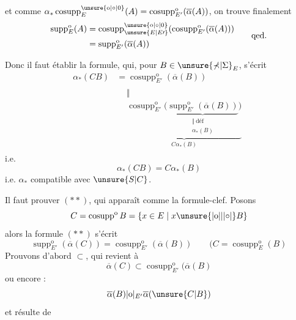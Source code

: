 
et comme $\alpha_*\operatorname{cosupp}^{\unsure{\mathrm{o}|\circ|0}}_E(A)=\operatorname{cosupp}^{\mathrm{o}}_{E'}(\overline\alpha(A))$, on trouve finalement
\[
\begin{aligned}
\operatorname{supp}^{\mathrm{o}}_E(A)&=\operatorname{cosupp}^{\unsure{\mathrm{o}|\circ|0}}_{\unsure{E|E\prime}}(\operatorname{cosupp}^{\mathrm{o}}_{E'}(\overline\alpha(A)))\\
&=\operatorname{supp}^{\mathrm{o}}_{E'}(\overline\alpha(A))
\end{aligned}
\qquad\text{qed.}
\]

Donc il faut établir la formule, qui, pour $B\in\unsure{\mathbb\Sigma|\Sigma}_E$,  s'écrit
\[
\begin{aligned}
\alpha_*(CB)&=\operatorname{cosupp}^{\mathrm{o}}_{E'}(\overline\alpha(B))\\
&\begin{aligned}&\Vert\\
&\underbrace{\operatorname{cosupp}^{\mathrm{o}}_{E'}\bigl(\underbrace{\operatorname{supp}^{\mathrm{o}}_{E'}(\overline\alpha(B))}_{\substack{\Vert\ \text{déf}\\\alpha_*(B)}}\bigr)}_{C\alpha_*(B)}
\end{aligned}
\end{aligned}
\]
i.e.
\[
\boxed{\alpha_*(CB)=C\alpha_*(B)}
\]
i.e. $\alpha_*$ compatible avec $\unsure{S|C}$.

 Il faut  prouver $(**)$, qui apparaît comme la formule-clef.
Posons
\[
C=\operatorname{cosupp}^{\mathrm{o}}B=\{x\in E\mid x\unsure{|\mathrm{o}||\lvert\circ\rvert}B\}
\]
alors la formule $(**)$ s'écrit
\[
\operatorname{supp}^{\mathrm{o}}_{E'}(\overline\alpha(C))=\operatorname{cosupp}^{\mathrm{o}}_{E'}(\overline\alpha(B))
\qquad(C=\operatorname{cosupp}^{\mathrm{o}}_E(B)
\]
Prouvons d'abord $\subset$, qui revient à
\[
\overline\alpha(C)\subset\operatorname{cosupp}^{\mathrm{o}}_{E'}(\overline\alpha(B)
\]
ou encore :
\[
\overline\alpha(B)|\mathrm{o}|_{E'}\overline\alpha(\unsure{C|B})
\]
et résulte de 
